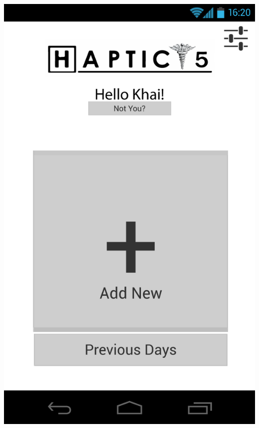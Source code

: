 \documentclass[pdftex,12pt,a4paper]{report}
\begin{document}
\begin{center}
	\includegraphics[scale=0.18]{Screens/01-Home---No-Selection.png}

\end{center}
\end{document}
